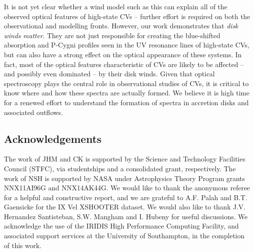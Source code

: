 \documentclass[preprint, a4paper, 11pt]{aastex}
\begin{document}
It is not yet clear whether a wind model such as this can
explain all of the observed optical features of high-state CVs --
further effort is required on both the observational
and modelling fronts.
However, our work demonstrates that {\sl disk winds matter}. They are
not just responsible for creating the blue-shifted absorption and
P-Cygni profiles seen in the UV resonance lines of high-state CVs, but
can also have a strong effect on the optical appearance of these
systems. In fact, most of the optical features characteristic of CVs
are likely to be affected -- and possibly even dominated -- by their disk
winds. Given that optical spectroscopy plays the central role in
observational studies of CVs, it is critical to know 
where and how these spectra are actually formed. We believe it is high
time for a renewed effort to understand the formation of spectra in
accretion disks and associated outflows. 



\subsection*{Acknowledgements}
The work of JHM and CK is supported by the Science and Technology Facilities Council (STFC), 
via studentships and a consolidated grant, respectively. 
The work of NSH is supported by NASA under Astrophysics Theory Program grants NNX11AI96G  and NNX14AK44G.
We would like to thank the anonymous referee for a helpful and constructive report, and 
we are  grateful to A.F. Palah and B.T. Gaensicke for the IX Vel XSHOOTER dataset.
We would also like to thank J.V. Hernandez Santisteban, S.W. Mangham and I. Hubeny for useful discussions. 
We acknowledge the use of the IRIDIS High Performance Computing Facility, 
and associated support services at the University of Southampton, in the completion of this work.



\end{document}
